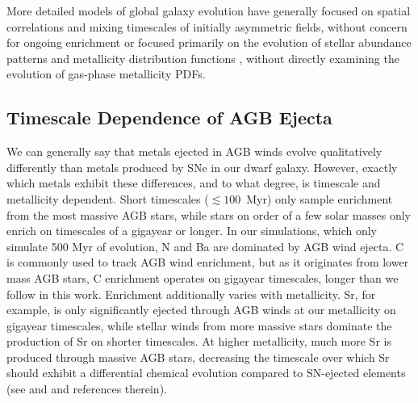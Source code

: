 More detailed models of global galaxy evolution have generally focused on spatial correlations and mixing timescales of initially asymmetric fields, without concern for ongoing enrichment \citep[e.g.][]{deAvillez2002,Petit2015} or focused primarily on the evolution of stellar abundance patterns and metallicity distribution functions \citep[e.g][]{Jeon2017,Hirai2017,Escala2018}, without directly examining the evolution of gas-phase metallicity PDFs.


\subsection{Timescale Dependence of AGB Ejecta}
\label{sec:discussion:metal yields}
We can generally say that metals ejected in AGB winds evolve qualitatively differently than metals produced by SNe in our dwarf galaxy. However, exactly which metals exhibit these differences, and to what degree, is timescale and metallicity dependent. Short timescales ($\lesssim 100$~Myr) only sample enrichment from the most massive AGB stars, while stars on order of a few solar masses only enrich on timescales of a gigayear or longer. In our simulations, which only simulate 500 Myr of evolution, N and Ba are dominated by AGB wind ejecta. C is commonly used to track AGB wind enrichment, but as it originates from lower mass AGB stars, C enrichment operates on gigayear timescales, longer than we follow in this work. Enrichment additionally varies with metallicity. Sr, for example, is only significantly ejected through AGB winds at our metallicity on gigayear timescales, while stellar winds from more massive stars dominate the production of Sr on shorter timescales. At higher metallicity, much more Sr is produced through massive AGB stars, decreasing the timescale over which Sr should exhibit a differential chemical evolution compared to SN-ejected elements (see \cite{Ritter2018} and \cite{Ritter2018b} and references therein).


